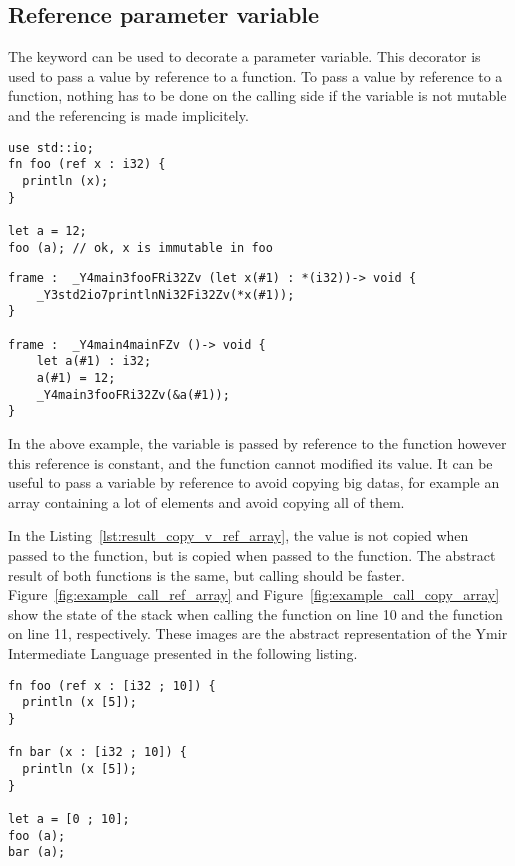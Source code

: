 \subsection{Reference parameter variable}
\label{sec:ref_param}

The  keyword can be used to decorate a parameter variable. This
decorator is used to pass a value by reference to a function. To pass a value by
reference to a function, nothing has to be done on the calling side if the
variable is not mutable and the referencing is made implicitely.

\begin{lstlisting}[style=coloredverbatim]
use std::io;
fn foo (ref x : i32) {
  println (x);
}

let a = 12;
foo (a); // ok, x is immutable in foo
\end{lstlisting}

\begin{lstlisting}[style=lyilVerb]
frame :  _Y4main3fooFRi32Zv (let x(#1) : *(i32))-> void {
    _Y3std2io7printlnNi32Fi32Zv(*x(#1));
}

frame :  _Y4main4mainFZv ()-> void {
    let a(#1) : i32;
    a(#1) = 12;
    _Y4main3fooFRi32Zv(&a(#1));
}
\end{lstlisting}

In the above example, the variable  is passed by reference to the
function  however this reference is constant, and the function
 cannot modified its value. It can be useful to pass a variable by
reference to avoid copying big datas, for example an array containing a lot of
elements and avoid copying all of them.



In the Listing~\ref{lst:result_copy_v_ref_array}, the value is not copied when passed to the 
function, but is copied when passed to the  function. The abstract
result of both functions is the same, but calling  should be faster.
Figure~\ref{fig:example_call_ref_array} and
Figure~\ref{fig:example_call_copy_array} show the state of the stack when
calling the  function on line 10 and the  function on
line 11, respectively. These images are the abstract representation of the Ymir
Intermediate Language presented in the following listing.

\begin{lstlisting}[style=coloredverbatim, label=lst:result_copy_v_ref_array, caption=Example of passing an array by reference vs. by value]
fn foo (ref x : [i32 ; 10]) {
  println (x [5]);
}

fn bar (x : [i32 ; 10]) {
  println (x [5]);
}

let a = [0 ; 10];
foo (a);
bar (a);
\end{lstlisting}

